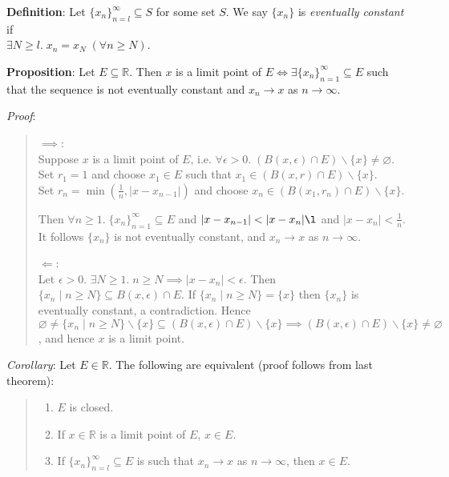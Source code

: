\documentclass[11pt]{article}
\begin{document}
\textbf{Definition}: Let $\{x_n\}_{n=l}^\infty \subseteq S$ for some set $S$. We say $\{x_n\}$ is \emph{eventually constant} if\\
$\exists N \geq l.\; x_n = x_N\; (\forall n \geq N)$. 

\textbf{Proposition}: Let $E \subseteq \mathbb{R}$. Then $x$ is a limit point of $E \iff \exists \{x_n\}_{n=1}^\infty \subseteq E$ such that the sequence is not eventually constant and $x_n \to x$ as $n \to \infty$.

\emph{Proof}:
\begin{quote}\vspace{-0.3cm}
$\implies$:\\
Suppose $x$ is a limit point of $E$, i.e. $\forall \epsilon > 0.\; (B(x, \epsilon) \cap E) \backslash \{x\} \neq \varnothing$. Set $r_1 = 1$ and choose $x_1 \in E$ such that $x_1 \in (B(x, r) \cap E) \backslash \{x\}$.\\
Set $r_n = \min(\frac{1}{n}, |x-x_{n-1}|)$ and choose $x_n \in (B(x_1, r_n) \cap E) \backslash \{x\}$.

Then $\forall n \geq 1.\; \{x_n\}_{n=1}^\infty \subseteq E$ and $|x-x_{n-1}| < |x-x_n|\l$ and $|x-x_n| < \frac{1}{n}$. It follows $\{x_n\}$ is not eventually constant, and $x_n \to x$ as $n \to \infty$.

$\Longleftarrow$:\\
Let $\epsilon > 0$. $\exists N \geq 1.\; n \geq N \implies |x-x_n| < \epsilon$. Then $\{x_n \;|\; n \geq N\} \subseteq B(x, \epsilon) \cap E$. If $\{x_n \;|\; n \geq N\} = \{x\}$ then $\{x_n\}$ is eventually constant, a contradiction. Hence $\varnothing \neq \{x_n \;|\; n \geq N\} \backslash \{x\} \subseteq (B(x, \epsilon) \cap E) \backslash \{x\} \implies (B(x, \epsilon) \cap E) \backslash \{x\} \neq \varnothing$, and hence $x$ is a limit point.
\end{quote}

\emph{Corollary}: Let $E \in \mathbb{R}$. The following are equivalent (proof follows from last theorem):
\begin{quote}\vspace{-0.3cm}
	\begin{enumerate}
	\item $E$ is closed.
	\item If $x \in \mathbb{R}$ is a limit point of $E$, $x \in E$.
	\item If $\{x_n\}_{n=l}^\infty \subseteq E$ is such that $x_n \to x$ as $n \to \infty$, then $x \in E$.
	\end{enumerate}
\end{quote}
\end{document}
